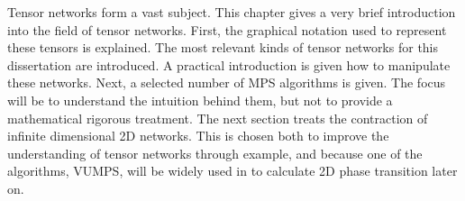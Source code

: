 
Tensor networks form a vast subject. This chapter gives a very brief introduction into the field of tensor networks. First, the graphical notation used to represent these tensors is explained. The most relevant kinds of tensor networks for this dissertation are introduced. A practical introduction is given how to manipulate these networks. Next, a selected number of MPS algorithms is given. The focus will be to understand the intuition behind them, but not to  provide a mathematical rigorous treatment. The next section treats the contraction of infinite dimensional 2D networks. This is chosen both to improve the understanding of tensor networks through example, and because one of the algorithms, VUMPS, will be widely used in to calculate 2D phase transition later on.